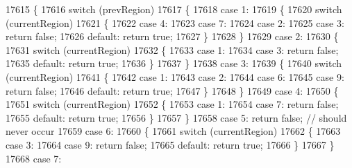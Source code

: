 \begin{DoxyCode}
17615 \{
17616   \textcolor{keywordflow}{switch} (prevRegion)
17617   \{
17618     \textcolor{keywordflow}{case} 1:
17619     \{
17620       \textcolor{keywordflow}{switch} (currentRegion)
17621       \{
17622         \textcolor{keywordflow}{case} 4:
17623         \textcolor{keywordflow}{case} 7:
17624         \textcolor{keywordflow}{case} 2:
17625         \textcolor{keywordflow}{case} 3: \textcolor{keywordflow}{return} \textcolor{keyword}{false};
17626         \textcolor{keywordflow}{default}: \textcolor{keywordflow}{return} \textcolor{keyword}{true};
17627       \}
17628     \}
17629     \textcolor{keywordflow}{case} 2:
17630     \{
17631       \textcolor{keywordflow}{switch} (currentRegion)
17632       \{
17633         \textcolor{keywordflow}{case} 1:
17634         \textcolor{keywordflow}{case} 3: \textcolor{keywordflow}{return} \textcolor{keyword}{false};
17635         \textcolor{keywordflow}{default}: \textcolor{keywordflow}{return} \textcolor{keyword}{true};
17636       \}
17637     \}
17638     \textcolor{keywordflow}{case} 3:
17639     \{
17640       \textcolor{keywordflow}{switch} (currentRegion)
17641       \{
17642         \textcolor{keywordflow}{case} 1:
17643         \textcolor{keywordflow}{case} 2:
17644         \textcolor{keywordflow}{case} 6:
17645         \textcolor{keywordflow}{case} 9: \textcolor{keywordflow}{return} \textcolor{keyword}{false};
17646         \textcolor{keywordflow}{default}: \textcolor{keywordflow}{return} \textcolor{keyword}{true};
17647       \}
17648     \}
17649     \textcolor{keywordflow}{case} 4:
17650     \{
17651       \textcolor{keywordflow}{switch} (currentRegion)
17652       \{
17653         \textcolor{keywordflow}{case} 1:
17654         \textcolor{keywordflow}{case} 7: \textcolor{keywordflow}{return} \textcolor{keyword}{false};
17655         \textcolor{keywordflow}{default}: \textcolor{keywordflow}{return} \textcolor{keyword}{true};
17656       \}
17657     \}
17658     \textcolor{keywordflow}{case} 5: \textcolor{keywordflow}{return} \textcolor{keyword}{false}; \textcolor{comment}{// should never occur}
17659     \textcolor{keywordflow}{case} 6:
17660     \{
17661       \textcolor{keywordflow}{switch} (currentRegion)
17662       \{
17663         \textcolor{keywordflow}{case} 3:
17664         \textcolor{keywordflow}{case} 9: \textcolor{keywordflow}{return} \textcolor{keyword}{false};
17665         \textcolor{keywordflow}{default}: \textcolor{keywordflow}{return} \textcolor{keyword}{true};
17666       \}
17667     \}
17668     \textcolor{keywordflow}{case} 7:

\end{DoxyCode}
